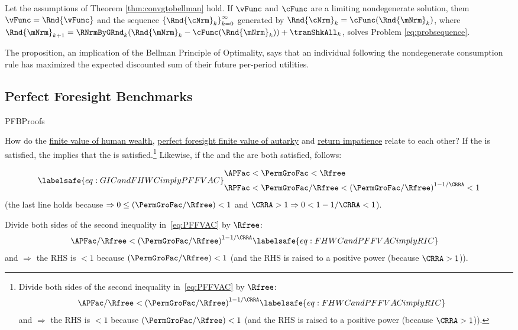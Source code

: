 \documentclass[\econtexRoot/BufferStockTheory]{subfiles}
\begin{document}
\begin{proposition}
Let the assumptions of Theorem \ref{thm:convgtobellman} hold. If $\vFunc$ and $\cFunc$ are a limiting nondegenerate solution, them $\vFunc= \Rnd{\vFunc}$ and the sequence $\left\{\Rnd{\cNrm}_{k}\right\}_{k=0}^{\infty}$ generated by  $\Rnd{\cNrm}_{k} = \cFunc(\Rnd{\mNrm}_{k})$, where $\Rnd{\mNrm}_{k+1} = \RNrmByGRnd_{k}(\Rnd{\mNrm}_{k} -  \cFunc(\Rnd{\mNrm}_{k})) + \tranShkAll_{k}$, solves Problem \eqref{eq:probsequence}. 
\end{proposition}

The proposition, an implication of the Bellman Principle of Optimality, says that an individual following the nondegenerate consumption rule has maximized the expected discounted sum of their future per-period utilities.


\subsection{Perfect Foresight Benchmarks}\label{sec:PFBProofs}\hypertarget{}{PFBProofs}


How do the \hyperlink{FHWC}{finite value of human wealth}, \hyperlink{PFFVAC}{perfect foresight finite value of autarky} and \hyperlink{RIC}{return impatience} relate to each other?
If the {\FHWC} is satisfied, the {\PFFVAC} implies that the {\RIC} is satisfied.\footnote{Divide both sides of the second inequality in~\eqref{eq:PFFVAC} by $\Rfree$:
%
%
  \begin{align*}
    \APFac/\Rfree & < {(\PermGroFac/\Rfree)}^{1-1/\CRRA}  \labelsafe{eq:FHWCandPFFVACimplyRIC}
  \end{align*}
  and {\FHWC} $\Rightarrow$ the RHS is $< 1$ because $(\PermGroFac/\Rfree) < 1$ (and the RHS is raised to a positive power (because $\CRRA>1$)).}  Likewise, if the {\FHWC} and the {\GICRaw} are both satisfied, {\PFFVAC} follows:
  
\begin{equation}\labelsafe{eq:GICandFHWCimplyPFFVAC}
  \begin{split}
    \APFac & < \PermGroFac < \Rfree
    \\   \RPFac & < \PermGroFac/\Rfree < {(\PermGroFac/\Rfree)}^{1-1/\CRRA} < 1
  \end{split}
\end{equation}
(the last line holds because {\FHWC} $\Rightarrow 0 \leq (\PermGroFac/\Rfree) < 1$ and $\CRRA > 1 \Rightarrow 0 < 1-1/\CRRA < 1$).

Divide both sides of the second inequality in~\eqref{eq:PFFVAC} by $\Rfree$:
  \begin{align}
    \APFac/\Rfree & < {(\PermGroFac/\Rfree)}^{1-1/\CRRA}  \labelsafe{eq:FHWCandPFFVACimplyRIC}
  \end{align}
  and {\FHWC} $\Rightarrow$ the RHS is $< 1$ because $(\PermGroFac/\Rfree) < 1$ (and the RHS is raised to a positive power (because $\CRRA>1$)).
\end{document}
